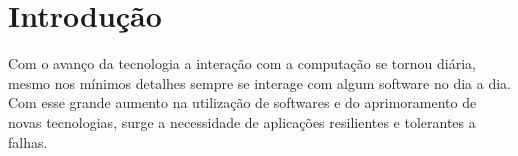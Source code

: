 \documentclass[
    12pt,
    openright, 
    oneside,
    a4paper,
    french,
    english,
    brazil
    ]{facom-ufu-abntex2}
\theoremstyle{definition}
\begin{document}
\imprimircapa
\imprimirfolhaderosto









\tableofcontents*
\cleardoublepage


\textual


\chapter{Introdução}

Com o avanço da tecnologia a interação com a computação se tornou diária, mesmo
nos mínimos detalhes sempre se interage com algum software no dia a dia. Com
esse grande aumento na utilização de softwares e do aprimoramento de novas tecnologias, 
surge a necessidade de aplicações resilientes e tolerantes a falhas. 
\end{document}
